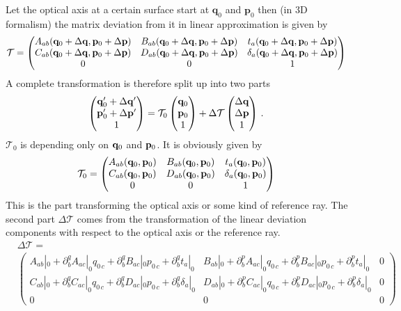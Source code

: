 \documentclass[12pt,a4paper,twoside,openright,BCOR10mm,headsepline,titlepage,abstracton,chapterprefix,final]{scrreprt}
\newcommand\Vector[1]{{\mathbf{#1}}}
\begin{document}
\newcommand{\qni}[1]{q_{0\,#1}}
\newcommand{\pni}[1]{p_{0\,#1}}
Let the optical axis at a certain surface start at $\Vector{q}_0$ and $\Vector{p}_0$ then (in 3D formalism)
the matrix deviation from it in linear approximation is given by
\begin{align}
  \mathcal{T} &= 
 \begin{pmatrix}
  A_{ab}(\qnv + \dqv,\pnv + \dpv) & B_{ab}(\qnv + \dqv,\pnv + \dpv) & t_{a}(\qnv + \dqv,\pnv + \dpv)\\
  C_{ab}(\qnv + \dqv,\pnv + \dpv) & D_{ab}(\qnv + \dqv,\pnv + \dpv) & \delta_{a}(\qnv + \dqv,\pnv + \dpv)\\
  0 & 0 & 1 
 \end{pmatrix}
\end{align}
A complete transformation is therefore split up into two parts
\begin{align}
 \begin{pmatrix}
  \qnv^\prime + \dqv^\prime\\
  \pnv^\prime + \dpv^\prime\\
  1
 \end{pmatrix} &=
  \mathcal{T}_{0} 
 \begin{pmatrix}
  \qnv \\
  \pnv \\
  1
 \end{pmatrix} +
  \Delta \mathcal{T}
 \begin{pmatrix}
  \dqv \\
  \dpv \\
  1
 \end{pmatrix}\,.
\end{align}
$\mathcal{T}_0$ is depending only on $\qnv$ and $\pnv$. It is obviously given by
\begin{align}
 \mathcal{T}_0 &= 
 \begin{pmatrix}
  A_{ab}(\qnv,\pnv) & B_{ab}(\qnv,\pnv) & t_{a}(\qnv,\pnv)\\
  C_{ab}(\qnv,\pnv) & D_{ab}(\qnv,\pnv) & \delta_{a}(\qnv,\pnv)\\
  0 & 0 & 1 
 \end{pmatrix}
\end{align}
This is the part transforming the optical axis or some kind of reference ray. The second part $\Delta \mathcal{T}$ comes from the transformation
of the linear deviation components with respect to the optical axis or the reference ray.
\begin{align}
 &\Delta \mathcal{T} = \nonumber\\&
 \begin{pmatrix}
  A_{ab} |_{0}+ \partial^q_b A_{ac}|_{0} \qni{c}  + \partial^q_b B_{ac} |_{0} \pni{c} + \partial^q_b t_a |_{0} &
   B_{ab} |_0 +  \partial^p_b A_{ac} |_{0} \qni{c} + \partial^p_b B_{ac} |_0 \pni{c} + \partial^p_b t_a |_0 & 0\\
  C_{ab} |_{0} + \partial^q_b C_{ac}|_{0} \qni{c} + \partial^q_b D_{ac} |_{0} \pni{c} + \partial^q_b \delta_a |_{0} &
   D_{ab} |_0 + \partial^p_b C_{ac} |_{0} \qni{c} + \partial^p_b D_{ac} |_0 \pni{c} + \partial^p_b \delta_a |_0 & 0\\
  0 & 0 & 0 
 \end{pmatrix}
\end{align}
\end{document}

